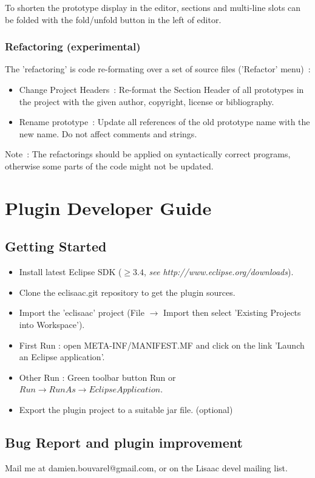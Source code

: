 \documentclass{article}
\begin{document}
To shorten the prototype display in the editor, sections and multi-line slots can be folded with the fold/unfold button in the left of editor.

\subsubsection{Refactoring (experimental)}

The 'refactoring' is code re-formating over a set of source files ('Refactor' menu)~:
\begin{itemize}
\item{Change Project Headers~: Re-format the Section Header of all prototypes in the project with the given author, copyright, license or bibliography.}
\item{Rename prototype~: Update all references of the old prototype name with the new name. Do not affect comments and strings.}
\end{itemize}

Note~: The refactorings should be applied on syntactically correct programs, otherwise some parts of the code might not be updated.

\section{Plugin Developer Guide}
%

\subsection{Getting Started}

\begin{itemize}
\item{Install latest Eclipse SDK ($\geq 3.4$, {\it{} see http://www.eclipse.org/downloads}).}\\
\item{Clone the eclisaac.git repository to get the plugin sources.}\\
\item{Import the 'eclisaac' project (File $\rightarrow$ Import then select 'Existing Projects into Workspace').}\\
\item{First Run : open META-INF/MANIFEST.MF and click on the link 'Launch an Eclipse application'.}
\item{Other Run : Green toolbar button  Run or $Run \rightarrow Run As \rightarrow EclipseApplication$.}\\
\item{Export the plugin project to a suitable jar file. (optional)}
\end{itemize}

\subsection{Bug Report and plugin improvement}

Mail me at damien.bouvarel@gmail.com, or on the Lisaac devel mailing list.
\end{document}
